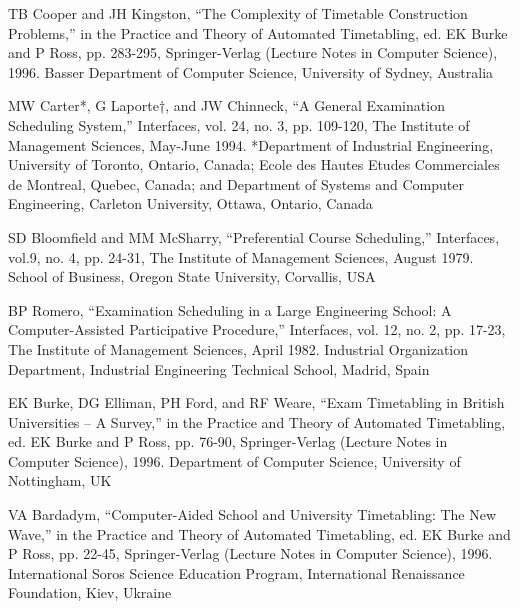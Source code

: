 



\begin{thebibliography}{99}

TB Cooper and JH Kingston, “The Complexity of Timetable Construction Problems,”
in the Practice and Theory of Automated Timetabling, ed. EK Burke and P Ross,
pp. 283-295, Springer-Verlag (Lecture Notes in Computer Science), 1996. Basser
Department of Computer Science, University of Sydney, Australia

 MW Carter*, G Laporte†, and JW Chinneck, “A General Examination Scheduling
System,” Interfaces, vol. 24, no. 3, pp. 109-120, The Institute of Management Sciences,
May-June 1994. *Department of Industrial Engineering, University of
Toronto, Ontario, Canada; Ecole des Hautes Etudes Commerciales de Montreal,
Quebec, Canada; and Department of Systems and Computer Engineering, Carleton
University, Ottawa, Ontario, Canada

 SD Bloomfield and MM McSharry, “Preferential Course Scheduling,” Interfaces, vol.9, no. 4, pp. 24-31, The Institute of Management Sciences, August 1979. School of Business, Oregon State University, Corvallis, USA

 BP Romero, “Examination Scheduling in a Large Engineering School: A
Computer-Assisted Participative Procedure,” Interfaces, vol. 12, no. 2, pp. 17-23, The
Institute of Management Sciences, April 1982. Industrial Organization Department,
Industrial Engineering Technical School, Madrid, Spain

 EK Burke, DG Elliman, PH Ford, and RF Weare, “Exam Timetabling in British
Universities – A Survey,” in the Practice and Theory of Automated Timetabling, ed. EK
Burke and P Ross, pp. 76-90, Springer-Verlag (Lecture Notes in Computer Science),
1996. Department of Computer Science, University of Nottingham, UK

 VA Bardadym, “Computer-Aided School and University Timetabling: The New
Wave,” in the Practice and Theory of Automated Timetabling, ed. EK Burke and P Ross,
pp. 22-45, Springer-Verlag (Lecture Notes in Computer Science), 1996. International
Soros Science Education Program, International Renaissance Foundation,
Kiev, Ukraine


\end{thebibliography}
